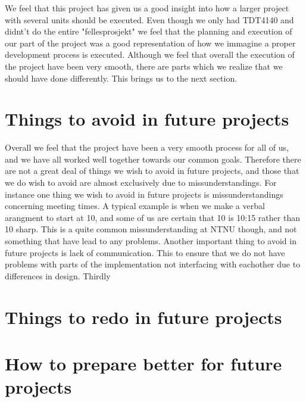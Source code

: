 We feel that this project has given us a good insight into how a larger project with several units should be executed. Even though we only had TDT4140 and didnt't do the entire "fellesprosjekt" we feel that the planning and execution of our part of the project was a good representation of how we immagine a proper development process is executed. Although we feel that overall the execution of the project have been very smooth, there are parts which we realize that we should have done differently. This brings us to the next section.

\section{Things to avoid in future projects}
Overall we feel that the project have been a very smooth process for all of us, and we have all worked well together towards our common goals. Therefore there are not a great deal of things we wish to avoid in future projects, and those that we do wish to avoid are almost exclusively due to missunderstandings. 
For instance one thing we wish to avoid in future projects is missunderstandings concerning meeting times. A typical example is when we make a verbal arangment to start at 10, and some of us are certain that 10 is 10:15 rather than 10 sharp. This is a quite common missunderstanding at NTNU though, and not something that have lead to any problems. 
Another important thing to avoid in future projects is lack of communication. This to ensure that we do not have problems with parts of the implementation not interfacing with eachother due to differences in design.
Thirdly  
\section{Things to redo in future projects}

\section{How to prepare better for future projects}
